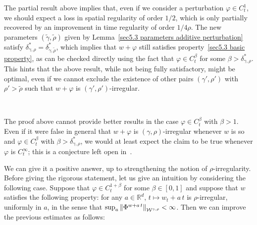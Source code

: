 \documentclass[10pt]{article}
\newcommand{\comma}{{,}}
\newcommand{\tmcolor}[2]{{\color{#1}{#2}}}
\begin{document}
The partial result above implies that, even if we consider a perturbation
$\varphi \in C^1_t$, we should expect a loss in spatial regularity of order $1
/ 2$, which is only partially recovered by an improvement in time regularity
of order $1 / 4 \rho$. The new parameters $(\tilde{\gamma}, \tilde{\rho})$
given by Lemma~\ref{sec5.3 parameters additive perturbation} satisfy
$\delta^{\ast}_{\gamma, \rho} = \delta^{\ast}_{\tilde{\gamma}, \tilde{\rho}}$,
which implies that $w + \varphi$ still satisfies property~\eqref{sec5.3 basic
property}, as can be checked directly using the fact that $\varphi \in
C^{\beta}_t$ for some $\beta > \delta^{\ast}_{\gamma, \rho}$. This hints that
the above result, while not being fully satisfactory, might be optimal, even
if we cannot exclude the existence of other pairs $(\gamma', \rho')$ with
$\rho' > \tilde{\rho}$ such that $w + \varphi$ is $(\gamma',
\rho')$\mbox{-}irregular.

\

The proof above cannot provide better results in the case $\varphi \in
C^{\beta}_t$ with $\beta > 1$. Even if it were false in general that $w +
\varphi$ is $(\gamma, \rho)$-irregular whenever $w$ is so and $\varphi \in
C^{\beta}_t$ with $\beta > \delta^{\ast}_{\gamma, \rho}$, we would at least
expect the claim to be true whenever $\varphi$ is $C^{\infty}_t$; this is a
conjecture left open in~{\cite{catelliergubinelli}}.

We can give it a positive answer, up to strengthening the notion of
$\rho$-irregularity. Before giving the rigorous statement, let us give an
intuition by considering the following case. Suppose that $\varphi \in C^{1 +
\beta}_t$ for some $\beta \in [0, 1]$ and suppose that $w$ satisfies the
following property: for any $a \in \mathbb{R}^d$, $t \mapsto w_t + a \, t$ is
$\rho$-irregular, uniformly in $a$, in the sense that $\sup_a \left\|
\tmcolor{blue}{\tmcolor{black}{\Phi^{w + a \, t}}}
\right\|_{\mathcal{W}^{\gamma \comma \rho}} < \infty$. Then we can improve the
previous estimates as follows:
\end{document}
